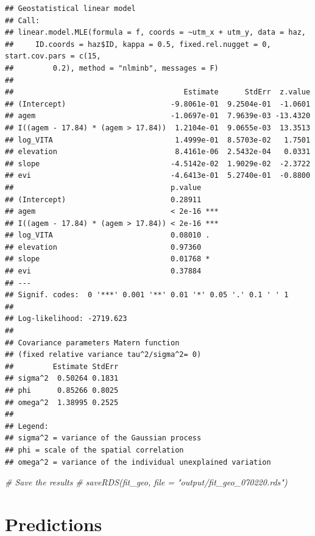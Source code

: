 \documentclass[11pt,]{article}
\newenvironment{Shaded}{\begin{snugshade}}{\end{snugshade}}
\newcommand{\CommentTok}[1]{\textcolor[rgb]{0.56,0.35,0.01}{\textit{#1}}}
\begin{document}
\begin{verbatim}
## Geostatistical linear model 
## Call: 
## linear.model.MLE(formula = f, coords = ~utm_x + utm_y, data = haz, 
##     ID.coords = haz$ID, kappa = 0.5, fixed.rel.nugget = 0, start.cov.pars = c(15, 
##         0.2), method = "nlminb", messages = F)
## 
##                                       Estimate      StdErr  z.value
## (Intercept)                        -9.8061e-01  9.2504e-01  -1.0601
## agem                               -1.0697e-01  7.9639e-03 -13.4320
## I((agem - 17.84) * (agem > 17.84))  1.2104e-01  9.0655e-03  13.3513
## log_VITA                            1.4999e-01  8.5703e-02   1.7501
## elevation                           8.4161e-06  2.5432e-04   0.0331
## slope                              -4.5142e-02  1.9029e-02  -2.3722
## evi                                -4.6413e-01  5.2740e-01  -0.8800
##                                    p.value    
## (Intercept)                        0.28911    
## agem                               < 2e-16 ***
## I((agem - 17.84) * (agem > 17.84)) < 2e-16 ***
## log_VITA                           0.08010 .  
## elevation                          0.97360    
## slope                              0.01768 *  
## evi                                0.37884    
## ---
## Signif. codes:  0 '***' 0.001 '**' 0.01 '*' 0.05 '.' 0.1 ' ' 1
## 
## Log-likelihood: -2719.623
##  
## Covariance parameters Matern function 
## (fixed relative variance tau^2/sigma^2= 0) 
##         Estimate StdErr
## sigma^2  0.50264 0.1831
## phi      0.85266 0.8025
## omega^2  1.38995 0.2525
## 
## Legend: 
## sigma^2 = variance of the Gaussian process 
## phi = scale of the spatial correlation 
## omega^2 = variance of the individual unexplained variation
\end{verbatim}

\begin{Shaded}
\begin{Highlighting}[]
\CommentTok{# Save the results}
\CommentTok{# saveRDS(fit_geo, file = "output/fit_geo_070220.rds")}
\end{Highlighting}
\end{Shaded}

\hypertarget{predictions}{%
\section{Predictions}\label{predictions}}
\end{document}
